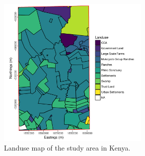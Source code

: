 \documentclass[12pt,a4paper, twoside, english]{article}
\begin{document}





\begin{figure}[H]
  \centering
  \includegraphics[width=0.65\textwidth]{figures/KEN_Landuse.png}
  \caption[Landuse map of Laikipia]{Landuse map of the study area in Kenya.}
  \label{fig:landuse_ken}
\end{figure}
\end{document}
